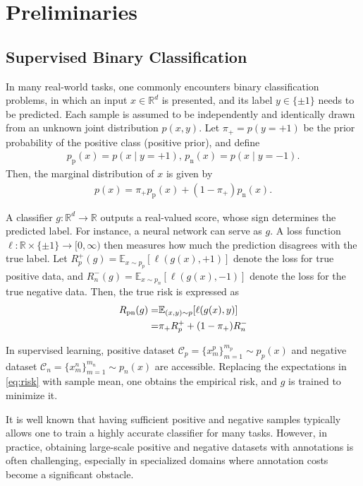\section{Preliminaries}
\label{sec:preliminaries}

\subsection{Supervised Binary Classification}
In many real-world tasks, one commonly encounters binary classification problems, in which an input $x \in \mathbb{R}^d$ is presented, and its label $y \in \{\pm 1\}$ needs to be predicted. Each sample is assumed to be independently and identically drawn from an unknown joint distribution $p(x,y)$. Let $\pi_{+} = p(y=+1)$ be the prior probability of the positive class (positive prior), and define
\begin{align*}
p_{\mathrm{p}}(x) = p(x \mid y=+1)
\text{, }
p_{\mathrm{n}}(x) = p(x \mid y=-1).
\end{align*}
Then, the marginal distribution of $x$ is given by
\begin{align*}
p(x)
= \pi_{+}p_{\mathrm{p}}(x) + (1-\pi_{+})p_{\mathrm{n}}(x).
\end{align*}

A classifier $g: \mathbb{R}^d \to \mathbb{R}$ outputs a real-valued score, whose sign determines the predicted label. For instance, a neural network can serve as $g$. A loss function $\ell:\mathbb{R} \times \{\pm 1\} \to [0,\infty)$ then measures how much the prediction disagrees with the true label. Let $R^+_p(g) = \mathbb{E}_{x \sim p_p} [\ell(g(x), +1)]$ denote the loss for true positive data, and $R^-_n(g) = \mathbb{E}_{x \sim p_n} [\ell(g(x), -1)]$ denote the loss for the true negative data. Then, the true risk is expressed as
\begin{align}
    R_{\mathrm{pn}}(g) =& \mathbb{E}_{(x,y)\sim p}[\ell(g(x),y)] \notag \\
    =& \pi_{+}R^+_p + (1 - \pi_{+})R^-_n \label{eq:risk} 
\end{align}

In supervised learning, positive dataset $\mathcal{C}_p = \{x^p_m\}_{m=1}^{m_p} \sim p_p(x)$ and negative dataset $\mathcal{C}_n = \{ x^n_m \}_{m=1}^{m_n} \sim p_n(x)$ are accessible. Replacing the expectations in \eqref{eq:risk} with sample mean, one obtains the empirical risk, and $g$ is trained to minimize it.


It is well known that having sufficient positive and negative samples typically allows one to train a highly accurate classifier for many tasks. However, in practice, obtaining large-scale positive and negative datasets with annotations is often challenging, especially in specialized domains where annotation costs become a significant obstacle.

